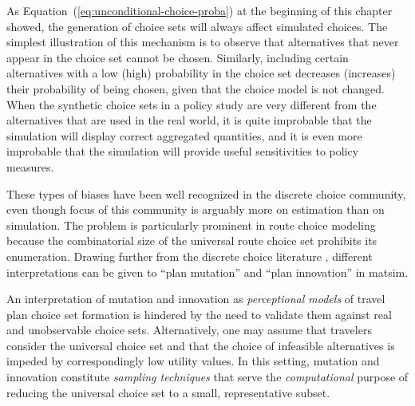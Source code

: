 % 
%

As Equation~(\ref{eq:unconditional-choice-proba}) at the beginning of this chapter showed, the generation of choice sets will always affect simulated choices.
%
The simplest illustration of this mechanism is to observe that alternatives that never appear in the choice set cannot be chosen. Similarly, including certain alternatives with a low (high) probability in the choice set decreases (increases) their probability of being chosen, given that the choice model is not changed. When the synthetic choice sets in a policy study are very different from the alternatives that are used in the real world, it is quite improbable that the simulation will display correct aggregated quantities, and it is even more improbable that the simulation will provide useful sensitivities to policy measures.

These types of biases have been well recognized in the discrete choice community,
even though focus of this community is arguably more on estimation than on
simulation.
The problem is particularly prominent in route choice modeling because the combinatorial
size of the universal route choice set prohibits its enumeration.
Drawing further from the discrete choice literature \citep[specifically][]{frejinger-2010}, 
different interpretations can be given to ``plan mutation'' and ``plan
innovation'' in \gls{matsim}. 
%
%

An interpretation of mutation and innovation as
\emph{perceptional models} of travel plan choice set formation is hindered by
the need to validate them against real and unobservable choice sets.
Alternatively, one may assume that travelers consider the universal choice set and that the choice of infeasible 
alternatives is impeded by correspondingly low utility values. In this setting, mutation and innovation
constitute \emph{sampling techniques} that serve the \emph{computational} purpose of reducing the universal choice
set to a small, representative subset.

